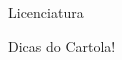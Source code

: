 \begin{subsecao}{Licenciatura}
\begin{subsubsecao}{Dicas do Cartola!}
\begin{enumerate}
\end{enumerate}

\end{subsubsecao}

\end{subsecao}
